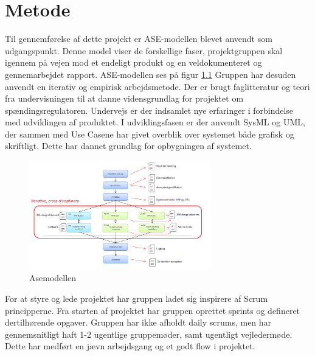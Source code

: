 \chapter{Metode}


Til gennemførelse af dette projekt er ASE-modellen blevet anvendt som udgangspunkt. Denne model viser de forskellige faser, projektgruppen skal igennem på vejen mod et endeligt produkt og en veldokumenteret og gennemarbejdet rapport. ASE-modellen ses på figur \ref{fig:Asemodel} Gruppen har desuden anvendt en iterativ og empirisk arbejdsmetode. Der er brugt faglitteratur og teori fra undervisningen til at danne vidensgrundlag for projektet om spændingsregulatoren. Undervejs er der indsamlet nye erfaringer i forbindelse med udviklingen af produktet. 
I udviklingsfasen er der anvendt SysML og UML, der sammen med Use Casene har givet overblik over systemet både grafisk og skriftligt. Dette har dannet grundlag for opbygningen af systemet. 

\begin{figure}[H] 
	\centering
	\includegraphics[width=0.7\textwidth]{Figure/Asemodel}
	\caption{Asemodellen}
	\label{fig:Asemodel}
\end{figure}

For at styre og lede projektet har gruppen ladet sig inspirere af Scrum principperne. Fra starten af projektet har gruppen oprettet sprints og defineret dertilhørende opgaver. Gruppen har ikke afholdt daily scrums, men har gennemsnitligt haft 1-2 ugentlige gruppemøder, samt ugentligt vejledermøde. Dette har medført en jævn arbejdsgang og et godt flow i projektet. 